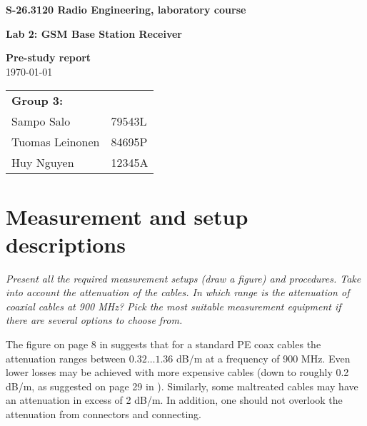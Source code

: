 \documentclass[a4paper, 12pt]{article}
\newlength{\oneLine}
\begin{document}
\begin{titlepage}
\pagestyle{empty}
\begin{center}

\vspace*{30mm}
\noindent\LARGE{\textbf{S-26.3120 Radio Engineering, laboratory course}}

\vspace*{20mm}

\Large{\textbf{Lab 2: GSM Base Station Receiver}}\\

\vspace*{15mm}

\large{\textbf{Pre-study report}}\\
\vspace{15mm}
\large{\today}
	
\vspace*{30mm}
\large{
	\begin{tabular}{l l}
		\textbf{Group 3:} 	& \\
		Sampo Salo			& 79543L	\\
		Tuomas Leinonen 	& 84695P	\\
		Huy Nguyen			& 12345A			
	\end{tabular}
}

\end{center}

\end{titlepage}

\section{Measurement and setup descriptions}

\textit{Present all the required measurement setups (draw a figure) 
and procedures. Take into account the attenuation of the cables. In 
which range is the attenuation of coaxial cables at 900 MHz? Pick 
the most suitable measurement equipment if there are several options 
to choose from.}

\vspace*{\oneLine}
\noindent
The figure on page 8 in \cite{hs} suggests that for a standard PE coax 
cables the attenuation ranges between $0.32 \ldots 1.36$ dB/m at a frequency 
of 900 MHz. Even lower losses may be achieved with more expensive cables 
(down to roughly 0.2 dB/m, as suggested on page 29 in \cite{hs}). Similarly, 
some maltreated cables may have an attenuation in excess of 2 dB/m. In 
addition, one should not overlook the attenuation from connectors and 
connecting.
\end{document}
